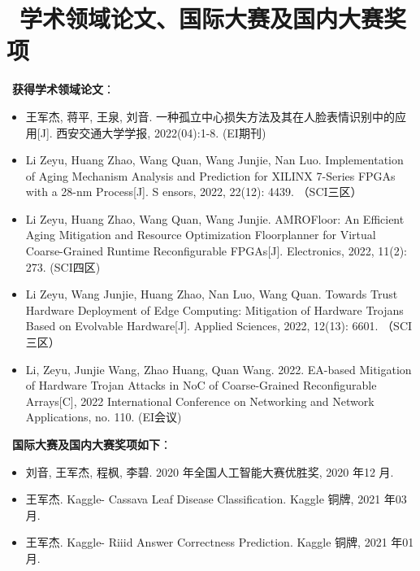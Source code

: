 \documentclass{resume}
\begin{document}
	\section{\faInfo\ 学术领域论文、国际大赛及国内大赛奖项}
	\faHandORight\ \textbf{获得学术领域论文}：
	\begin{itemize}[parsep=0.75ex]
		\item 王军杰, 蒋平, 王泉, 刘音. 一种孤立中心损失方法及其在人脸表情识别中的应用[J]. 西安交通大学学报, 2022(04):1-8. (EI期刊)
		\item Li Zeyu, Huang Zhao, Wang Quan, Wang Junjie, Nan Luo. Implementation of Aging Mechanism Analysis and Prediction for XILINX 7-Series FPGAs with a 28-nm Process[J]. S ensors, 2022, 22(12): 4439. （SCI三区）
		\item Li Zeyu, Huang Zhao, Wang Quan, Wang Junjie. AMROFloor: An Efficient Aging Mitigation and Resource Optimization Floorplanner for Virtual Coarse-Grained Runtime Reconfigurable FPGAs[J]. Electronics, 2022, 11(2): 273. (SCI四区)
		\item Li Zeyu, Wang Junjie, Huang Zhao, Nan Luo, Wang Quan. Towards Trust Hardware Deployment of Edge Computing: Mitigation of Hardware Trojans Based on Evolvable Hardware[J]. Applied Sciences, 2022, 12(13): 6601. （SCI三区）
		\item Li, Zeyu, Junjie Wang, Zhao Huang, Quan Wang. 2022. EA-based Mitigation of Hardware Trojan Attacks in NoC of Coarse-Grained Reconfigurable Arrays[C], 2022 International Conference on Networking and Network Applications, no. 110. (EI会议)
	\end{itemize}
	\faHandORight\ \textbf{国际大赛及国内大赛奖项如下}：	
	\begin{itemize}[parsep=0.75ex]
		\item 刘音, 王军杰, 程枫, 李碧. 2020 年全国人工智能大赛优胜奖, 2020 年12 月.
		\item 王军杰. Kaggle- Cassava Leaf Disease Classification. Kaggle 铜牌, 2021 年03月.
		\item 王军杰. Kaggle- Riiid Answer Correctness Prediction. Kaggle 铜牌, 2021 年01月.
	\end{itemize}
	
	

	
\end{document}

